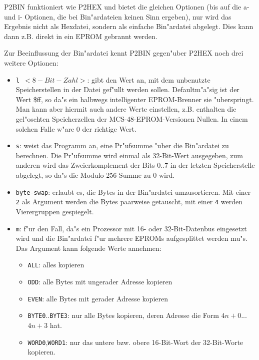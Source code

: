 \documentclass[12pt,a4paper,twoside]{report}
\newcommand{\tty}[1]{{\tt #1}}
\begin{document}
P2BIN funktioniert wie P2HEX und bietet die gleichen Optionen (bis
auf die a- und i- Optionen, die bei Bin"ardateien keinen Sinn ergeben), nur
wird das Ergebnis nicht als Hexdatei, sondern als einfache Bin"ardatei
abgelegt.  Dies kann dann z.B. direkt in ein EPROM gebrannt werden.
\par
Zur Beeinflussung der Bin"ardatei kennt P2BIN gegen"uber P2HEX noch
drei weitere Optionen:
\begin{itemize}
\item{\tty{l $<8-Bit-Zahl>$}: gibt den Wert an, mit dem unbenutzte
      Speicherstellen in der Datei gef"ullt werden sollen.
      Defaultm"a"sig ist der Wert \$ff, so da"s ein halbwegs
      intelligenter EPROM-Brenner sie "uberspringt.  Man kann aber
      hiermit auch andere Werte einstellen, z.B. enthalten die gel"oschten
      Speicherzellen der MCS-48-EPROM-Versionen Nullen.  In einem solchen
      Falle w"are 0 der richtige Wert.}
\item{\tty{s}: weist das Programm an, eine Pr"ufsumme "uber die Bin"ardatei zu
      berechnen.  Die Pr"ufsumme wird einmal als 32-Bit-Wert ausgegeben,
      zum anderen wird das Zweierkomplement der Bits 0..7 in der letzten
      Speicherstelle abgelegt, so da"s die Modulo-256-Summe zu 0 wird.}
\item{\tty{byte-swap}: erlaubt es, die Bytes in der Bin"ardatei umzusortieren.
      Mit einer \tty{2} als Argument werden die Bytes paarweise getauscht,
      mit einer \tty{4} werden Vierergruppen gespiegelt.}
\item{\tty{m}: f"ur den Fall, da"s ein Prozessor mit 16- oder 32-Bit-Datenbus
      eingesetzt wird und die Bin"ardatei f"ur mehrere EPROMs aufgesplittet
      werden mu"s.  Das Argument kann folgende Werte annehmen:
      \begin{itemize}
      \item{\tty{ALL}: alles kopieren}
      \item{\tty{ODD}: alle Bytes mit ungerader Adresse kopieren}
      \item{\tty{EVEN}: alle Bytes mit gerader Adresse kopieren}
      \item{\tty{BYTE0}..\tty{BYTE3}: nur alle Bytes kopieren, deren Adresse die Form
            $4n+0$...$4n+3$ hat.}
      \item{\tty{WORD0},\tty{WORD1}: nur das untere bzw. obere 16-Bit-Wort der
            32-Bit-Worte kopieren.}
      \end{itemize}}
\end{itemize}
\end{document}
